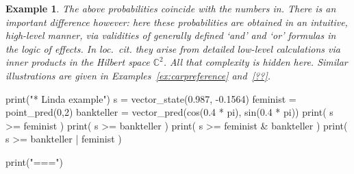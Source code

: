 \documentclass[leqno]{tufte-book} %
\newtheorem{example}[theorem]{Example}
\newcommand{\CN}{\mathbb{C}}     %
\begin{document}
{\begin{example}
The above probabilities coincide with the numbers
in\cite{BusemeyerB12}.  There is an important difference however: here
these probabilities are obtained in an intuitive, high-level manner,
via validities of generally defined `and' and `or' formulas in the
logic of effects. In \emph{loc.\ cit.} they arise from detailed
low-level calculations via inner products in the Hilbert space
$\CN^2$. All that complexity is hidden here.  Similar illustrations
are given in Examples~\ref{ex:carpreference} and~\ref{??}.
\end{example}

    print("* Linda example")
    s = vector_state(0.987, -0.1564)
    feminist = point_pred(0,2)
    bankteller = vector_pred(cos(0.4 * pi), sin(0.4 * pi))
    print( s >= feminist )
    print( s >= bankteller )
    print( s >= feminist & bankteller )
    print( s >= bankteller | feminist )

    print("\n===\n")

}
\end{document}
